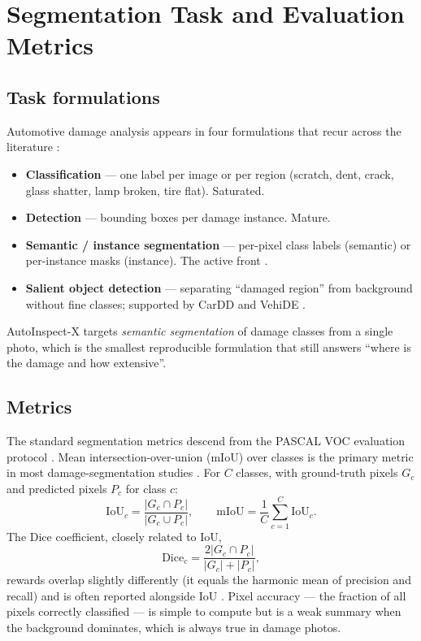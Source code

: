 \documentclass[conference]{IEEEtran}
\begin{document}
\section{Segmentation Task and Evaluation Metrics}
\label{sec:metrics}
\subsection{Task formulations}
Automotive damage analysis appears in four formulations that recur across the
literature \cite{hasan2025}:
\begin{itemize}
  \item \textbf{Classification} --- one label per image or per region
  (scratch, dent, crack, glass shatter, lamp broken, tire flat). Saturated.
  \item \textbf{Detection} --- bounding boxes per damage instance. Mature.
  \item \textbf{Semantic / instance segmentation} --- per-pixel class labels
  (semantic) or per-instance masks (instance). The active front
  \cite{cardd2023,vehide2023,crashcar101}.
  \item \textbf{Salient object detection} --- separating ``damaged region'' from
  background without fine classes; supported by CarDD and VehiDE
  \cite{cardd2023,vehide2023}.
\end{itemize}
AutoInspect-X targets \emph{semantic segmentation} of damage classes from a
single photo, which is the smallest reproducible formulation that still answers
``where is the damage and how extensive''.

\subsection{Metrics}
The standard segmentation metrics descend from the PASCAL VOC evaluation
protocol \cite{voc2010}. Mean intersection-over-union (mIoU) over classes is the
primary metric in most damage-segmentation studies \cite{cardd2023,vehide2025}.
For $C$ classes, with ground-truth pixels $G_c$ and predicted pixels $P_c$ for
class $c$:
\begin{equation}
\mathrm{IoU}_c = \frac{|G_c \cap P_c|}{|G_c \cup P_c|},
\qquad
\mathrm{mIoU} = \frac{1}{C}\sum_{c=1}^{C}\mathrm{IoU}_c .
\label{eq:iou}
\end{equation}
The Dice coefficient, closely related to IoU,
\begin{equation}
\mathrm{Dice}_c = \frac{2|G_c \cap P_c|}{|G_c| + |P_c|} ,
\label{eq:dice}
\end{equation}
rewards overlap slightly differently (it equals the harmonic mean of
precision and recall) and is often reported alongside IoU
\cite{voc2010,cardd2023}. Pixel accuracy --- the fraction of all pixels correctly
classified --- is simple to compute but is a weak summary when the background
dominates, which is always true in damage photos.
\end{document}
